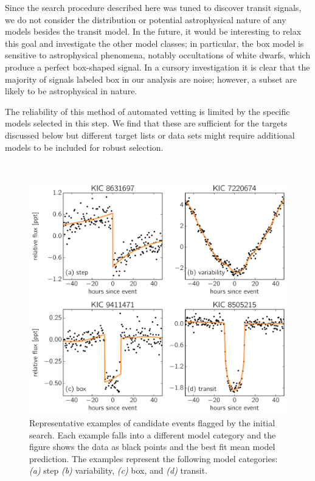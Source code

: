 \documentclass[manuscript, letterpaper]{aastex6}
\newcommand{\dfmfiglabel}[1]{\label{fig:#1}}
\newcommand{\modelname}[1]{{\textsf{#1}}}
\begin{document}
Since the search procedure described here was tuned to discover transit
signals, we do not consider the distribution or potential astrophysical nature
of any models besides the \modelname{transit} model.
In the future, it would be interesting to relax this goal and investigate the
other model classes; in particular, the \modelname{box} model is
sensitive to astrophysical phenomena, notably occultations of white dwarfs,
which produce a perfect box-shaped signal.  In a cursory investigation
it is clear that the majority of signals labeled
\modelname{box} in our analysis are noise; however, a subset are likely to be
astrophysical in nature.

The reliability of this method of automated vetting is limited by the specific
models selected in this step.
We find that these are sufficient for the targets discussed below but
different target lists or data sets might require additional models to be
included for robust selection.

\begin{figure}[p]~\\
\begin{center}
\includegraphics[width=\textwidth]{figures/model_comp.pdf}
\end{center}
\caption{%
Representative examples of candidate events flagged by the initial search.
Each example falls into a different model category and the figure shows the
data as black points and the best fit mean model prediction.
The examples represent the following model categories:
\emph{(a)} step \emph{(b)} variability, \emph{(c)} box, and \emph{(d)}
transit.
\dfmfiglabel{model-comp}}
\end{figure}
\end{document}
